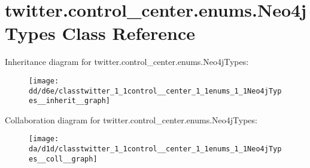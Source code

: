 \hypertarget{classtwitter_1_1control__center_1_1enums_1_1Neo4jTypes}{}\section{twitter.\+control\+\_\+center.\+enums.\+Neo4j\+Types Class Reference}
\label{classtwitter_1_1control__center_1_1enums_1_1Neo4jTypes}


Inheritance diagram for twitter.\+control\+\_\+center.\+enums.\+Neo4j\+Types\+:\nopagebreak
\begin{figure}[H]
\begin{center}
\leavevmode
\texttt{[image: dd/d6e/classtwitter\_1\_1control\_\_center\_1\_1enums\_1\_1Neo4jTypes\_\_inherit\_\_graph]}
\end{center}
\end{figure}


Collaboration diagram for twitter.\+control\+\_\+center.\+enums.\+Neo4j\+Types\+:\nopagebreak
\begin{figure}[H]
\begin{center}
\leavevmode
\texttt{[image: da/d1d/classtwitter\_1\_1control\_\_center\_1\_1enums\_1\_1Neo4jTypes\_\_coll\_\_graph]}
\end{center}
\end{figure}
